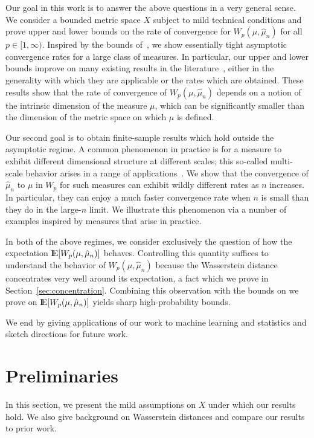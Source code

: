\documentclass[sts]{imsart}
\begin{document}
Our goal in this work is to answer the above questions in a very general sense.
We consider a bounded metric space $X$ subject to mild technical conditions and prove upper and lower bounds on the rate of convergence for $W_p(\mu, \hat \mu_n)$ for all $p \in [1, \infty)$.
Inspired by the bounds of~\cite{Dud68}, we show essentially tight asymptotic convergence rates for a large class of measures.
In particular, our upper and lower bounds improve on many existing results in the literature~\cite{Dud68,BoiLeg14,DerSchSch13,FouGui15}, either in the generality with which they are applicable or the rates which are obtained.
These results show that the rate of convergence of $W_p(\mu, \hat \mu_n)$ depends on a notion of the intrinsic dimension of the measure $\mu$, which can be significantly smaller than the dimension of the metric space on which $\mu$ is defined.

Our second goal is to obtain finite-sample results which hold outside the asymptotic regime.
A common phenomenon in practice is for a measure to exhibit different dimensional structure at different scales; this so-called multi-scale behavior arises in a range of applications~\cite{LitMagRos16,WakDonCho05,StaMurBig98}.
We show that the convergence of $\hat \mu_n$ to $\mu$ in $W_p$ for such measures can exhibit wildly different rates as $n$ increases.
In particular, they can enjoy a much faster convergence rate when $n$ is small than they do in the large-$n$ limit.
We illustrate this phenomenon via a number of examples inspired by measures that arise in practice.

In both of the above regimes, we consider exclusively the question of how the expectation ${\rm I}\kern-0.18em{\rm E}[W_p(\mu, \hat \mu_n)]$ behaves.
Controlling this quantity suffices to understand the behavior of $W_p(\mu, \hat \mu_n)$ because the Wasserstein distance concentrates very well around its expectation, a fact which we prove in Section~\ref{sec:concentration}.
Combining this observation with the bounds on we prove on ${\rm I}\kern-0.18em{\rm E}[W_p(\mu, \hat \mu_n)]$ yields sharp high-probability bounds.

We end by giving applications of our work to machine learning and statistics and sketch directions for future work.

\section{Preliminaries}\label{sec:prelim}
In this section, we present the mild assumptions on $X$ under which our results hold.
We also give background on Wasserstein distances and compare our results to prior work.
\end{document}
